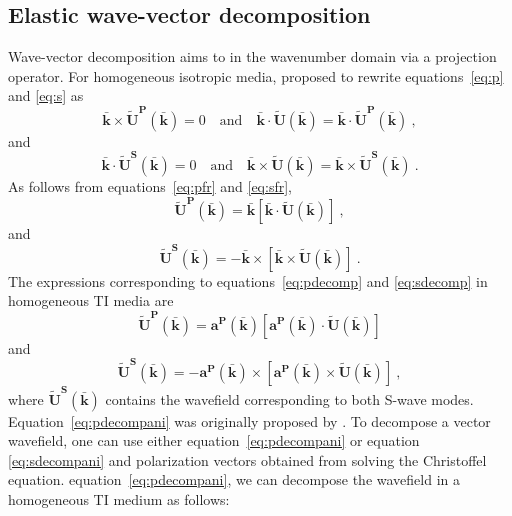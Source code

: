 \subsection{Elastic wave-vector decomposition}
Wave-vector decomposition aims to  in the wavenumber domain via a projection operator. For homogeneous isotropic media,
\cite{zm} proposed to rewrite equations~\ref{eq:p} and \ref{eq:s} as
\begin{equation}
\label{eq:pfr}
\mathbf{\bar{k}}\times\mathbf{\widetilde{U}^P(\bar{k})} = 0\quad\mbox{and}\quad\mathbf{\bar{k}}\cdot\mathbf{\widetilde{U}(\bar{k})} = \mathbf{\bar{k}}\cdot\mathbf{\widetilde{U}^P(\bar{k})}~,
\end{equation}
and
\begin{equation}
\label{eq:sfr}
\mathbf{\bar{k}}\cdot\mathbf{\widetilde{U}^S(\bar{k})} = 0\quad\mbox{and}\quad\mathbf{\bar{k}}\times\mathbf{\widetilde{U}(\bar{k})} = \mathbf{\bar{k}}\times\mathbf{\widetilde{U}^S(\bar{k})}~.
\end{equation}
As follows from equations~\ref{eq:pfr} and \ref{eq:sfr}, 
\begin{equation}
\label{eq:pdecomp}
\mathbf{\widetilde{U}^P(\bar{k})} = \mathbf{\bar{k}}[\mathbf{\bar{k}}\cdot\mathbf{\widetilde{U}(\bar{k})}]~,
\end{equation}
and
\begin{equation}
\label{eq:sdecomp}
\mathbf{\widetilde{U}^S(\bar{k})} = -\mathbf{\bar{k}}\times[\mathbf{\bar{k}}\times\mathbf{\widetilde{U}(\bar{k})}]~.
\end{equation}
The expressions corresponding to equations~\ref{eq:pdecomp} and \ref{eq:sdecomp} in homogeneous TI media are
\begin{equation}
\label{eq:pdecompani}
\mathbf{\widetilde{U}^{P}(\bar{k})} = \mathbf{a^{P}(\bar{k})}[\mathbf{a^{P}(\bar{k})}\cdot\mathbf{\widetilde{U}(\bar{k})}]
\end{equation}
and
\begin{equation}
\label{eq:sdecompani}
\mathbf{\widetilde{U}^{S}(\bar{k})} = -\mathbf{a^{P}(\bar{k})}\times[\mathbf{a^{P}(\bar{k})}\times\mathbf{\widetilde{U}(\bar{k})}]~,
\end{equation}
where $\mathbf{\widetilde{U}^{S}(\bar{k})}$ contains the wavefield corresponding to both S-wave modes.
Equation~\ref{eq:pdecompani} was originally proposed by \cite{joethesis}. To decompose a vector wavefield, one can use either equation~\ref{eq:pdecompani} or equation \ref{eq:sdecompani} and polarization vectors obtained from solving the Christoffel equation.  equation~\ref{eq:pdecompani}, we can decompose the wavefield in a homogeneous TI medium as follows:
